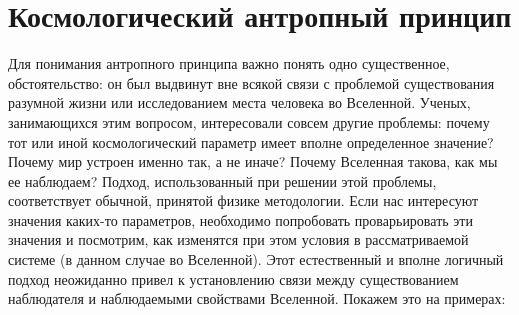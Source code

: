 \chapter{Космологический антропный принцип} \label{chapt4}

Для понимания антропного принципа важно понять одно существенное, обстоятельство: он был выдвинут вне всякой связи с проблемой существования разумной жизни или исследованием места человека во Вселенной. Ученых, занимающихся этим вопросом, интересовали совсем другие проблемы: почему тот или иной космологический параметр имеет вполне определенное значение? Почему мир устроен именно так, а не иначе? Почему Вселенная такова, как мы ее наблюдаем? Подход, использованный при решении этой проблемы, соответствует обычной, принятой физике методологии. Если нас интересуют значения каких-то параметров, необходимо попробовать проварьировать эти значения и посмотрим, как изменятся при этом условия в рассматриваемой системе (в данном случае во Вселенной). Этот естественный и вполне логичный подход неожиданно привел к установлению связи между существованием наблюдателя и наблюдаемыми свойствами Вселенной. Покажем это на примерах:

